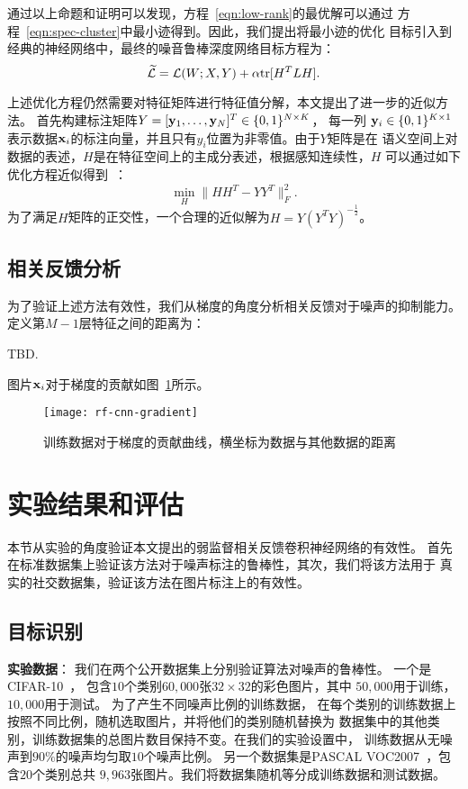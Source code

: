 通过以上命题和证明可以发现，方程~\eqref{eqn:low-rank}的最优解可以通过
方程~\eqref{eqn:spec-cluster}中最小迹得到。因此，我们提出将最小迹的优化
目标引入到经典的神经网络中，最终的噪音鲁棒深度网络目标方程为：
\begin{equation}\label{eqn:rf-cnn-obj}
    \widetilde{\mathcal{L}} = \mathcal{L}(W;X,Y) + \alpha \text{tr}[H^TLH].
\end{equation}

上述优化方程仍然需要对特征矩阵进行特征值分解，本文提出了进一步的近似方法。
首先构建标注矩阵$Y = [\mathbf{y}_1,\ldots, \mathbf{y}_N]^T \in \{0,1\}^{N\times K}$， 每一列
$\mathbf{y}_i\in\{0,1\}^{K\times
1}$表示数据$\mathbf{x}_i$的标注向量，并且只有$y_i$位置为非零值。由于$Y$矩阵是在
语义空间上对数据的表述，$H$是在特征空间上的主成分表述，根据感知连续性，$H$
可以通过如下优化方程近似得到~\cite{yang2011l2,ye2008discriminative}：
\begin{equation}
    \min_{H} \|HH^T - YY^T\|_F^2.
\end{equation}
为了满足$H$矩阵的正交性，一个合理的近似解为$H = Y(Y^TY)^{-\frac{1}{2}}$。

\subsection{相关反馈分析}
为了验证上述方法有效性，我们从梯度的角度分析相关反馈对于噪声的抑制能力。
定义第$M-1$层特征之间的距离为：

TBD.

图片$\mathbf{x}_i$对于梯度的贡献如图~\ref{fig:rf-cnn-gradient}所示。
\begin{figure}[ht]
    \center
    \texttt{[image: rf-cnn-gradient]}
    \caption{训练数据对于梯度的贡献曲线，横坐标为数据与其他数据的距离}\label{fig:rf-cnn-gradient}
\end{figure}

\section{实验结果和评估}
本节从实验的角度验证本文提出的弱监督相关反馈卷积神经网络的有效性。
首先在标准数据集上验证该方法对于噪声标注的鲁棒性，其次，我们将该方法用于
真实的社交数据集，验证该方法在图片标注上的有效性。

\subsection{目标识别}

\textbf{实验数据}： 我们在两个公开数据集上分别验证算法对噪声的鲁棒性。
一个是CIFAR-10~\cite{krizhevsky2009learning}，
包含$10$个类别$60,000$张$32\times 32$的彩色图片，其中
$50,000$用于训练，$10,000$用于测试。 为了产生不同噪声比例的训练数据，
在每个类别的训练数据上按照不同比例，随机选取图片，并将他们的类别随机替换为
数据集中的其他类别，训练数据集的总图片数目保持不变。在我们的实验设置中，
训练数据从无噪声到$90\%$的噪声均匀取$10$个噪声比例。
另一个数据集是PASCAL VOC2007~\cite{pascal-voc-2007}，包含$20$个类别总共
$9,963$张图片。我们将数据集随机等分成训练数据和测试数据。

